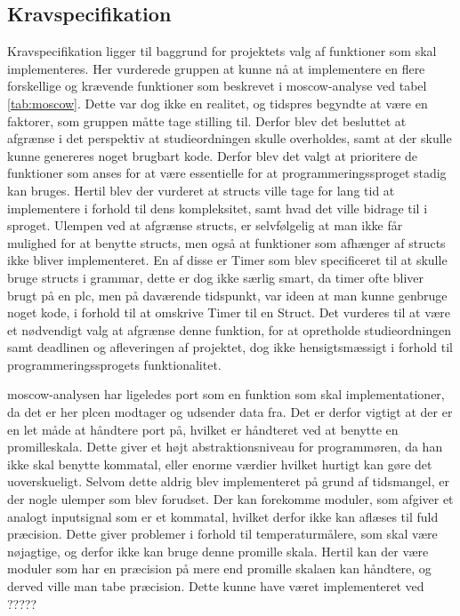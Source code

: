 \subsection*{Kravspecifikation}
Kravspecifikation ligger til baggrund for projektets valg af funktioner som skal implementeres.
Her vurderede gruppen at kunne nå at implementere en flere forskellige og krævende funktioner som beskrevet i \gls{moscow}-analyse ved tabel \ref{tab:moscow}.
Dette var dog ikke en realitet, og tidspres begyndte at være en faktorer, som gruppen måtte tage stilling til.
Derfor blev det besluttet at afgrænse i det perspektiv at studieordningen skulle overholdes, samt at der skulle kunne genereres noget brugbart kode.
Derfor blev det valgt at prioritere de funktioner som anses for at være essentielle for at programmeringssproget stadig kan bruges. Hertil blev der vurderet at structs ville tage for lang tid at implementere i forhold til dens kompleksitet, samt hvad det ville bidrage til i sproget.
Ulempen ved at afgrænse structs, er selvfølgelig at man ikke får mulighed for at benytte structs, men også at funktioner som afhænger af structs ikke bliver implementeret.
En af disse er Timer som blev specificeret til at skulle bruge structs i grammar, dette er dog ikke særlig smart, da timer ofte bliver brugt på en \gls{plc}, men på daværende tidspunkt, var ideen at man kunne genbruge noget kode, i forhold til at omskrive Timer til en Struct.
Det vurderes til at være et nødvendigt valg at afgrænse denne funktion, for at opretholde studieordningen samt deadlinen og afleveringen af projektet, dog ikke hensigtsmæssigt i forhold til programmeringssprogets funktionalitet.

\gls{moscow}-analysen har ligeledes port som en funktion som skal implementationer, da det er her \gls{plc}en modtager og udsender data fra.
Det er derfor vigtigt at der er en let måde at håndtere port på, hvilket er håndteret ved at benytte en promilleskala.
Dette giver et højt abstraktionsniveau for programmøren, da han ikke skal benytte kommatal, eller enorme værdier hvilket hurtigt kan gøre det uoverskueligt.
Selvom dette aldrig blev implementeret på grund af tidsmangel, er der nogle ulemper som blev forudset.
Der kan forekomme moduler, som afgiver et analogt inputsignal som er et kommatal, hvilket derfor ikke kan aflæses til fuld præcision. Dette giver problemer i forhold til temperaturmålere, som skal være nøjagtige, og derfor ikke kan bruge denne promille skala.
Hertil kan der være moduler som har en præcision på mere end promille skalaen kan håndtere, og derved ville man tabe præcision.
Dette kunne have været implementeret ved ????? 

